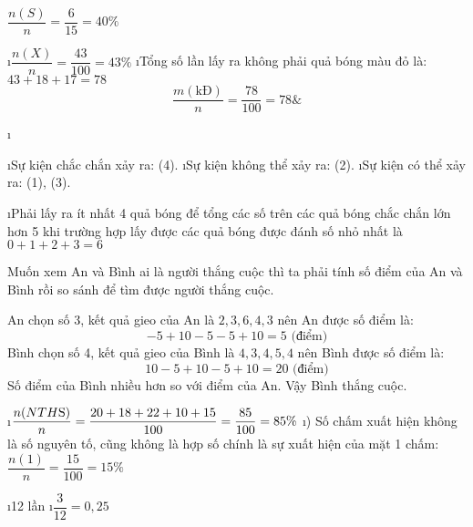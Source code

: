 \begin{Answer}{26}
		$\dfrac{{n(S)}}{n} = \dfrac{6}{{15}} = 40\% $
	
\end{Answer}
\begin{Answer}{27}
		\begin{enumerate}[a),leftmargin=*]
			\i $\dfrac{{n(X)}}{n} = \dfrac{{43}}{{100}} = 43\% $
			\i Tổng số lần lấy ra không phải quả bóng màu đỏ là: $43 + 18 + 17 = 78$
			\[\dfrac{m(\text{kĐ})}{n} = \dfrac{78}{100} = 78\&\]
		\end{enumerate}
	
\end{Answer}
\begin{Answer}{28}
		\begin{enumerate}[a),leftmargin=*]
			\i \begin{enumerate}[--,leftmargin=*]
				\i Sự kiện chắc chắn xảy ra: (4).
				\i Sự kiện không thể xảy ra: (2).
				\i Sự kiện có thể xảy ra: (1), (3).
			\end{enumerate}
			\i Phải lấy ra ít nhất 4 quả bóng để tổng các số trên các quả bóng chắc chắn lớn hơn 5 khi trường hợp lấy được các quả bóng được đánh số nhỏ nhất là  $0 + 1 + 2 + 3 = 6$
		\end{enumerate}
	
\end{Answer}
\begin{Answer}{29}
		Muốn xem An và Bình ai là người thắng cuộc thì ta phải tính số điểm của An và Bình rồi so sánh để tìm được người thắng cuộc.
		
		An chọn số 3, kết quả gieo của An là $2,3,6,4,3$ nên An được số điểm là:
		\[ - 5 + 10 - 5 - 5 + 10 = 5 \text{ (điểm)}\]
		Bình chọn số 4, kết quả gieo của Bình là $4,3,4,5,4$ nên Bình được số điểm là:
		\[10 - 5 + 10 - 5 + 10 = 20 \text{ (điểm)}\]
		Số điểm của Bình nhiều hơn so với điểm của An. Vậy Bình thắng cuộc.
	
\end{Answer}
\begin{Answer}{30}
		\begin{enumerate}[a),leftmargin=*]
			\i $\dfrac{{n(NTH{\rm{S}})}}{n} = \dfrac{{20 + 18 + 22 + 10 + 15}}{{100}} = \dfrac{{85}}{{100}} = 85\% $
			\i ) Số chấm xuất hiện không là số nguyên tố, cũng không là hợp số chính là sự xuất hiện của mặt 1 chấm: $\dfrac{{n(1)}}{n} = \dfrac{{15}}{{100}} = 15\%$
		\end{enumerate}
	
\end{Answer}
\begin{Answer}{31}
		\begin{enumerate}[a),leftmargin=*]
			\i 12 lần
			\i $\dfrac{3}{12} = 0,25$
		\end{enumerate}
	
\end{Answer}
